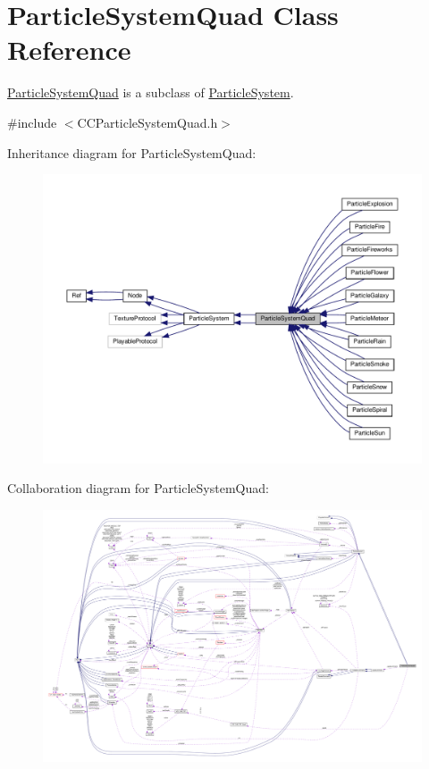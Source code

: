 \hypertarget{classParticleSystemQuad}{}\section{Particle\+System\+Quad Class Reference}
\label{classParticleSystemQuad}


\hyperlink{classParticleSystemQuad}{Particle\+System\+Quad} is a subclass of \hyperlink{classParticleSystem}{Particle\+System}.  




{\ttfamily \#include $<$C\+C\+Particle\+System\+Quad.\+h$>$}



Inheritance diagram for Particle\+System\+Quad\+:
\nopagebreak
\begin{figure}[H]
\begin{center}
\leavevmode
\includegraphics[width=350pt]{classParticleSystemQuad__inherit__graph}
\end{center}
\end{figure}


Collaboration diagram for Particle\+System\+Quad\+:
\nopagebreak
\begin{figure}[H]
\begin{center}
\leavevmode
\includegraphics[width=350pt]{classParticleSystemQuad__coll__graph}
\end{center}
\end{figure}
